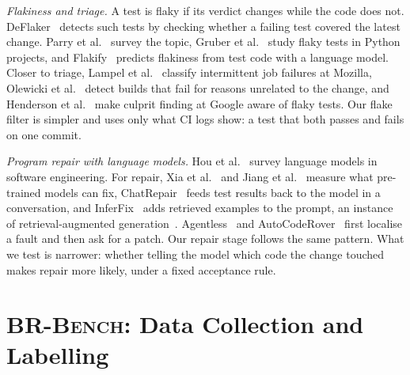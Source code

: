 \documentclass[10pt,conference]{IEEEtran}
\newcommand{\brb}{\textsc{BR-Bench}}
\begin{document}
\textit{Flakiness and triage.} A test is flaky if its verdict changes while the code does not. DeFlaker~\cite{bell2018deflaker} detects such tests by checking whether a failing test covered the latest change. Parry et al.~\cite{parry2021survey} survey the topic, Gruber et al.~\cite{gruber2021empirical} study flaky tests in Python projects, and Flakify~\cite{fatima2023flakify} predicts flakiness from test code with a language model. Closer to triage, Lampel et al.~\cite{lampel2021oranges} classify intermittent job failures at Mozilla, Olewicki et al.~\cite{olewicki2022brown} detect builds that fail for reasons unrelated to the change, and Henderson et al.~\cite{henderson2023flake} make culprit finding at Google aware of flaky tests. Our flake filter is simpler and uses only what CI logs show: a test that both passes and fails on one commit.

\textit{Program repair with language models.} Hou et al.~\cite{hou2024large} survey language models in software engineering. For repair, Xia et al.~\cite{xia2023automated} and Jiang et al.~\cite{jiang2023impact} measure what pre-trained models can fix, ChatRepair~\cite{xia2024automated} feeds test results back to the model in a conversation, and InferFix~\cite{jin2023inferfix} adds retrieved examples to the prompt, an instance of retrieval-augmented generation~\cite{lewis2020retrieval}. Agentless~\cite{xia2025agentless} and AutoCodeRover~\cite{zhang2024autocoderover} first localise a fault and then ask for a patch. Our repair stage follows the same pattern. What we test is narrower: whether telling the model which code the change touched makes repair more likely, under a fixed acceptance rule.

\section{\brb{}: Data Collection and Labelling}
\label{sec:data}
\end{document}
